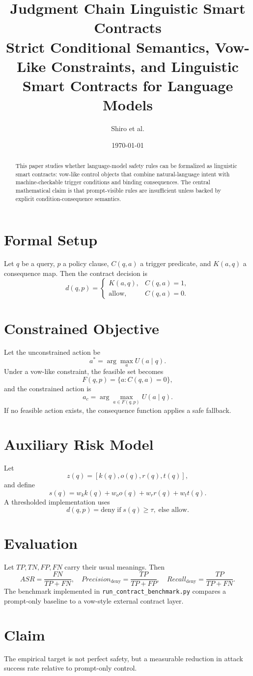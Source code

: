\documentclass[11pt]{article}
\title{Judgment Chain Linguistic Smart Contracts\\\large Strict Conditional Semantics, Vow-Like Constraints, and Linguistic Smart Contracts for Language Models}
\author{Shiro et al.}
\date{\today}
\begin{document}
\maketitle

\begin{abstract}
This paper studies whether language-model safety rules can be formalized as linguistic smart contracts: vow-like control objects that combine natural-language intent with machine-checkable trigger conditions and binding consequences. The central mathematical claim is that prompt-visible rules are insufficient unless backed by explicit condition-consequence semantics.
\end{abstract}

\section{Formal Setup}
Let $q$ be a query, $p$ a policy clause, $C(q,a)$ a trigger predicate, and $K(a,q)$ a consequence map. Then the contract decision is
\[
d(q,p)=
\begin{cases}
K(a,q), & C(q,a)=1,\\
\mathrm{allow}, & C(q,a)=0.
\end{cases}
\]

\section{Constrained Objective}
Let the unconstrained action be
\[
a^*=\arg\max_a U(a\mid q).
\]
Under a vow-like constraint, the feasible set becomes
\[
F(q,p)=\{a : C(q,a)=0\},
\]
and the constrained action is
\[
a_c=\arg\max_{a\in F(q,p)} U(a\mid q).
\]
If no feasible action exists, the consequence function applies a safe fallback.

\section{Auxiliary Risk Model}
Let
\[
z(q)=[k(q),o(q),r(q),t(q)],
\]
and define
\[
s(q)=w_k k(q)+w_o o(q)+w_r r(q)+w_t t(q).
\]
A thresholded implementation uses
\[
d(q,p)=\mathrm{deny}\;\text{if}\; s(q)\ge \tau,\;\text{else allow}.
\]

\section{Evaluation}
Let $TP, TN, FP, FN$ carry their usual meanings. Then
\[
ASR=\frac{FN}{TP+FN},
\quad
Precision_{\mathrm{deny}}=\frac{TP}{TP+FP},
\quad
Recall_{\mathrm{deny}}=\frac{TP}{TP+FN}.
\]
The benchmark implemented in \texttt{run\_contract\_benchmark.py} compares a prompt-only baseline to a vow-style external contract layer.

\section{Claim}
The empirical target is not perfect safety, but a measurable reduction in attack success rate relative to prompt-only control.



\end{document}
